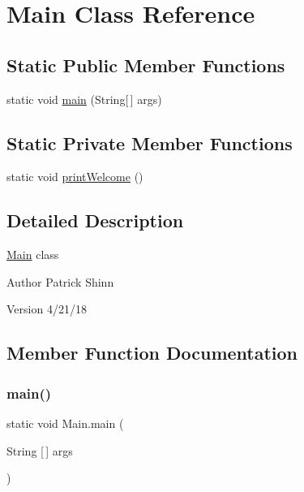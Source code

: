 \hypertarget{class_main}{}\section{Main Class Reference}
\label{class_main}
\subsection*{Static Public Member Functions}
\begin{DoxyCompactItemize}
\item 
static void \mbox{\hyperlink{class_main_a8a5d0f827edddff706cc0e6740d0579a}{main}} (String\mbox{[}$\,$\mbox{]} args)
\end{DoxyCompactItemize}
\subsection*{Static Private Member Functions}
\begin{DoxyCompactItemize}
\item 
static void \mbox{\hyperlink{class_main_adbd81691fbbab226d1411b7cf0b11441}{print\+Welcome}} ()
\end{DoxyCompactItemize}


\subsection{Detailed Description}
\mbox{\hyperlink{class_main}{Main}} class

\begin{DoxyAuthor}{Author}
Patrick Shinn 
\end{DoxyAuthor}
\begin{DoxyVersion}{Version}
4/21/18 
\end{DoxyVersion}


\subsection{Member Function Documentation}
\mbox{\label{class_main_a8a5d0f827edddff706cc0e6740d0579a}} 
\subsubsection{\texorpdfstring{main()}{main()}}
{\footnotesize\ttfamily static void Main.\+main (\begin{DoxyParamCaption}\item[{String \mbox{[}$\,$\mbox{]}}]{args }\end{DoxyParamCaption})\hspace{0.3cm}{\ttfamily [static]}}

